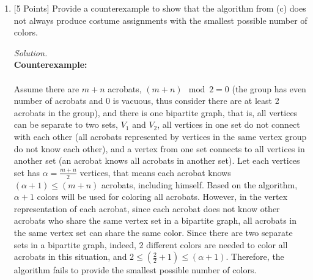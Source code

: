 \documentclass[10pt]{article}
\begin{document}
\begin{enumerate}[label=(\alph*)]
\begin{mdframed}
\begin{enumerate}[leftmargin=10mm]
    \end{enumerate}
    \end{mdframed}
    \item {[5 Points]} Provide a counterexample to show that the algorithm from (c) does not always produce costume assignments with the smallest possible number of colors.
    \begin{mdframed}
        \textit{Solution.}\\
        \textbf{Counterexample:}\\
        \\
        Assume there are $m + n$ acrobats, $(m + n) \mod 2 = 0$ (the group has even number of acrobats and 0 is vacuous, thus consider there are at least 2 acrobats in the group), and there is one bipartite graph, that is, all vertices can be separate to two sets, $V_1$ and $V_2$, all vertices in one set do not connect with each other (all acrobats represented by vertices in the same vertex group do not know each other), and a vertex from one set connects to all vertices in another set (an acrobat knows all acrobats in another set). Let each vertices set has $\alpha = \frac{m + n}{2}$ vertices, that means each acrobat knows $(\alpha + 1) \leq (m + n)$ acrobats, including himself. Based on the algorithm, $\alpha + 1$ colors will be used for coloring all acrobats. However, in the vertex representation of each acrobat, since each acrobat does not know other acrobats who share the same vertex set in a bipartite graph, all acrobats in the same vertex set can share the same color. Since there are two separate sets in a bipartite graph, indeed, 2 different colors are needed to color all acrobats in this situation, and $2 \leq (\frac{2}{2} + 1) \leq (\alpha + 1)$. Therefore, the algorithm fails to provide the smallest possible number of colors.
    \end{mdframed}
\end{enumerate}
\end{document}
